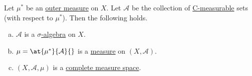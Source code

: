 \begin{theorem}\label{thm:Caratheodory-extension}
	Let \(\mu^{\ast} \) be an \hyperref[def:outer-measure]{outer measure} on \(X\). Let \(\mathcal{A} \) be the collection of \hyperref[def:C-measurable]{C-measurable} sets (with respect to \(\mu^{\ast} \)). Then the following holds.
	\begin{enumerate}[(a)]
		\item\label{thm:Caratheodory-extension-a} \(\mathcal{A}\) is a \hyperref[def:sigma-algebra]{\(\sigma\)-algebra} on \(X\).
		\item\label{thm:Caratheodory-extension-b} \(\mu = \at{\mu^{\ast} }{\mathcal{A} }{}\) is a \hyperref[def:measure]{measure} on \((X, \mathcal{A})\).
		\item\label{thm:Caratheodory-extension-c} \((X, \mathcal{A} , \mu)\) is a \hyperref[def:complete-measure-space]{complete measure space}.
	\end{enumerate}
\end{theorem}
